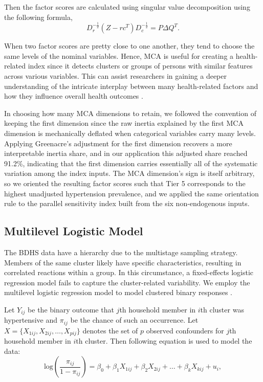\documentclass[
  12pt,
  a4paper]{article}
\begin{document}
Then the factor scores are calculated using singular value decomposition using the following formula,
\[D_r^{-\frac{1}{2}}(Z - rc^T )D_c^{-\frac{1}{2}} = P \Delta Q^T. \]

When two factor scores are pretty close to one another, they tend to choose the same levels of the nominal variables. Hence, MCA is useful for creating a health-related index since it detects clusters or groups of persons with similar features across various variables. This can assist researchers in gaining a deeper understanding of the intricate interplay between many health-related factors and how they influence overall health outcomes \citep{abdi2007multiple}.

In choosing how many MCA dimensions to retain, we followed the convention of keeping the first dimension since the raw inertia explained by the first MCA dimension is mechanically deflated when categorical variables carry many levels. Applying Greenacre's adjustment for the first dimension recovers a more interpretable inertia share, and in our application this adjusted share reached 91.2\%, indicating that the first dimension carries essentially all of the systematic variation among the index inputs. The MCA dimension's sign is itself arbitrary, so we oriented the resulting factor scores such that Tier 5 corresponds to the highest unadjusted hypertension prevalence, and we applied the same orientation rule to the parallel sensitivity index built from the six non-endogenous inputs.

\subsection{Multilevel Logistic Model}\label{multilevel-logistic-model}

The BDHS data have a hierarchy due to the multistage sampling strategy. Members of the same cluster likely have specific characteristics, resulting in correlated reactions within a group. In this circumstance, a fixed-effects logistic regression model fails to capture the cluster-related variability. We employ the multilevel logistic regression model to model clustered binary responses \citep{liu2006mixed}.

Let \(Y_{ij}\) be the binary outcome that \(j\)th household member in \(i\)th cluster was hypertensive and \(\pi_{ij}\) be the chance of such an occurrence. Let \(X=\{X_{1ij}, X_{2ij},\ldots, X_{pij}\}\) denotes the set of \(p\) observed confounders for \(j\)th household member in \(i\)th cluster. Then following equation is used to model the data:
\[\text{log}\left(\frac{\pi_{ij}}{1-\pi_{ij}}\right)=\beta_0+\beta_{1} X_{1ij}+ \beta_{2} X_{2ij} +\ldots+\beta_{k} X_{kij}+u_i,\]
\end{document}
